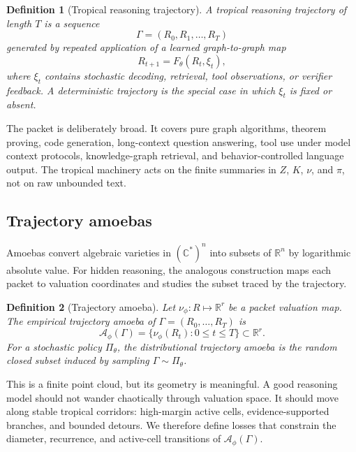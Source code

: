 \documentclass[11pt]{article}
\newtheorem{definition}{Definition}[section]
\newcommand{\R}{\mathbb{R}}
\newcommand{\calA}{\mathcal{A}}
\begin{document}
\begin{definition}[Tropical reasoning trajectory]
A tropical reasoning trajectory of length \(T\) is a sequence
\begin{equation}
\Gamma=(R_0,R_1,\ldots,R_T)
\end{equation}
generated by repeated application of a learned graph-to-graph map
\begin{equation}
R_{t+1}=F_\theta(R_t,\xi_t),
\end{equation}
where \(\xi_t\) contains stochastic decoding, retrieval, tool observations, or verifier feedback.  A deterministic trajectory is the special case in which \(\xi_t\) is fixed or absent.
\end{definition}

The packet is deliberately broad.  It covers pure graph algorithms, theorem proving, code generation, long-context question answering, tool use under model context protocols, knowledge-graph retrieval, and behavior-controlled language output.  The tropical machinery acts on the finite summaries in \(Z\), \(K\), \(\nu\), and \(\pi\), not on raw unbounded text.

\subsection{Trajectory amoebas}

Amoebas convert algebraic varieties in \((\mathbb C^*)^n\) into subsets of \(\R^n\) by logarithmic absolute value.  For hidden reasoning, the analogous construction maps each packet to valuation coordinates and studies the subset traced by the trajectory.

\begin{definition}[Trajectory amoeba]
Let \(\nu_\phi:R\mapsto\R^r\) be a packet valuation map.  The empirical trajectory amoeba of \(\Gamma=(R_0,\ldots,R_T)\) is
\begin{equation}
\calA_\phi(\Gamma)=\{\nu_\phi(R_t):0\le t\le T\}\subset\R^r.
\end{equation}
For a stochastic policy \(\Pi_\theta\), the distributional trajectory amoeba is the random closed subset induced by sampling \(\Gamma\sim\Pi_\theta\).
\end{definition}

This is a finite point cloud, but its geometry is meaningful.  A good reasoning model should not wander chaotically through valuation space.  It should move along stable tropical corridors: high-margin active cells, evidence-supported branches, and bounded detours.  We therefore define losses that constrain the diameter, recurrence, and active-cell transitions of \(\calA_\phi(\Gamma)\).
\end{document}
